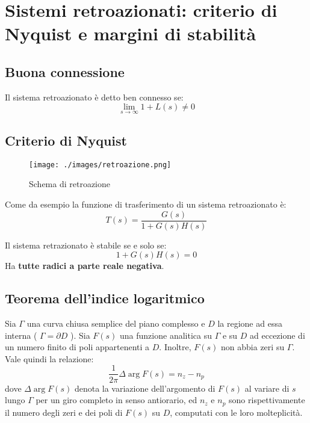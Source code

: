 \section{Sistemi retroazionati: criterio di Nyquist e margini di stabilità}

\subsection{Buona connessione}

\begin{definition}
  Il sistema retroazionato è detto ben connesso se:
  \begin{equation}
    \lim_{s\to\infty} 1 + L(s) \neq 0
  \end{equation}
\end{definition}


\subsection{Criterio di Nyquist}

\begin{figure}[h!]
  \centering
  \texttt{[image: ./images/retroazione.png]}
  \caption{Schema di retroazione}
  \label{fig:retroazione2}
\end{figure}

Come da esempio la funzione di trasferimento di un sistema retroazionato è:
\begin{equation}
  T(s) = \frac{G(s)}{1 + G(s)H(s)}
\end{equation}


Il sistema retrazionato è stabile se e solo se:
\begin{equation}
  1 + G(s)H(s) = 0
\end{equation}
Ha \textbf{tutte radici a parte reale negativa}.




\subsection{Teorema dell'indice logaritmico}
Sia \( \Gamma \) una curva chiusa semplice del piano complesso e \( D \) la
regione ad essa interna ( \( \Gamma = \partial D \) ). Sia \( F(s) \) una
funzione analitica su \( \Gamma \) e su \( D \) ad eccezione di un numero
finito di poli appartenenti a \( D \). Inoltre, \( F(s) \) non abbia zeri su \(
\Gamma \). Vale quindi la relazione: \begin{equation} \frac{1}{2\pi} \Delta
\arg F(s) = n_z - n_p \end{equation} dove \( \Delta \arg F(s) \) denota la
variazione dell'argomento di \( F(s) \) al variare di \( s \) lungo \( \Gamma
\) per un giro completo in senso antiorario, ed \( n_z \) e \( n_p \) sono
rispettivamente il numero degli zeri e dei poli di \( F(s) \) su \( D \),
computati con le loro molteplicità.





